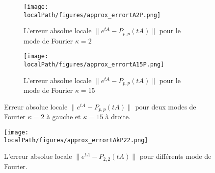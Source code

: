 

\begin{figure}
  \begin{subfigure}{.5\textwidth}
    \centering
    \texttt{[image: \\localPath/figures/approx\_errortA2P.png]}
    \caption{L'erreur absolue locale $\|e^{tA}-P_{p,p}(tA)\|$ pour le mode de Fourier $\kappa=2$}
  \end{subfigure}
  \begin{subfigure}{.5\textwidth}
    \centering
    \texttt{[image: \\localPath/figures/approx\_errortA15P.png]}
    \caption{L'erreur absolue locale $\|e^{tA}-P_{p,p}(tA)\|$ pour le mode de Fourier $\kappa=15$}
  \end{subfigure}
  \caption{Erreur absolue locale $\|e^{tA}-P_{p,p}(tA)\|$ pour deux modes de Fourier $\kappa=2$ à gauche et $\kappa=15$ à droite.}
\end{figure}

\begin{figure}
  \centering
  \texttt{[image: \\localPath/figures/approx\_errortAkP22.png]}
  \caption{L'erreur absolue locale $\|e^{tA}-P_{2,2}(tA)\|$ pour différents mode de Fourier.}
\end{figure}


